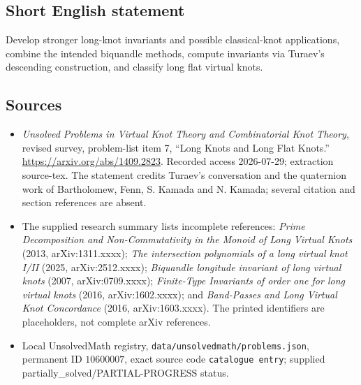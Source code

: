 \documentclass[11pt]{article}
\begin{document}
\subsection{Short English statement}
Develop stronger long-knot invariants and possible classical-knot applications, combine the intended biquandle methods, compute invariants via Turaev's descending construction, and classify long flat virtual knots.
\subsection{Sources}
\begin{itemize}
\item \emph{Unsolved Problems in Virtual Knot Theory and Combinatorial Knot Theory}, revised survey, problem-list item 7, ``Long Knots and Long Flat Knots.'' \url{https://arxiv.org/abs/1409.2823}. Recorded access 2026-07-29; extraction source-tex. The statement credits Turaev's conversation and the quaternion work of Bartholomew, Fenn, S. Kamada and N. Kamada; several citation and section references are absent.
\item The supplied research summary lists incomplete references: \emph{Prime Decomposition and Non-Commutativity in the Monoid of Long Virtual Knots} (2013, arXiv:1311.xxxx); \emph{The intersection polynomials of a long virtual knot I/II} (2025, arXiv:2512.xxxx); \emph{Biquandle longitude invariant of long virtual knots} (2007, arXiv:0709.xxxx); \emph{Finite-Type Invariants of order one for long virtual knots} (2016, arXiv:1602.xxxx); and \emph{Band-Passes and Long Virtual Knot Concordance} (2016, arXiv:1603.xxxx). The printed identifiers are placeholders, not complete arXiv references.
\item Local UnsolvedMath registry, \texttt{data/unsolvedmath/problems.json}, permanent ID \(10600007\), exact source code \texttt{catalogue entry}; supplied partially\_solved/PARTIAL-PROGRESS status.
\end{itemize}
\end{document}
